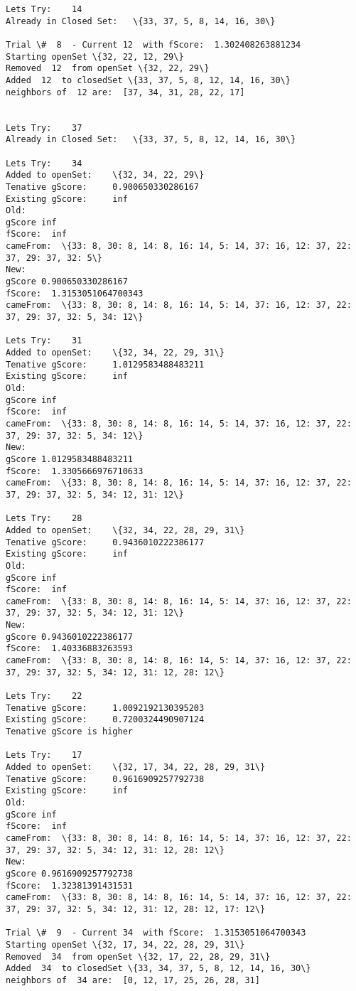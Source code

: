 \documentclass[11pt]{article}
\begin{document}
\begin{Verbatim}[commandchars=\\\{\}]
Lets Try:	 14
Already in Closed Set:	 \{33, 37, 5, 8, 14, 16, 30\}

Trial \#  8  - Current 12  with fScore:  1.302408263881234
Starting openSet \{32, 22, 12, 29\}
Removed  12  from openSet \{32, 22, 29\}
Added  12  to closedSet \{33, 37, 5, 8, 12, 14, 16, 30\}
neighbors of  12 are:  [37, 34, 31, 28, 22, 17] 


Lets Try:	 37
Already in Closed Set:	 \{33, 37, 5, 8, 12, 14, 16, 30\}

Lets Try:	 34
Added to openSet:	 \{32, 34, 22, 29\}
Tenative gScore:	 0.900650330286167
Existing gScore:	 inf
Old:
gScore inf
fScore:  inf
cameFrom:  \{33: 8, 30: 8, 14: 8, 16: 14, 5: 14, 37: 16, 12: 37, 22: 37, 29: 37, 32: 5\}
New:
gScore 0.900650330286167
fScore:  1.3153051064700343
cameFrom:  \{33: 8, 30: 8, 14: 8, 16: 14, 5: 14, 37: 16, 12: 37, 22: 37, 29: 37, 32: 5, 34: 12\}

Lets Try:	 31
Added to openSet:	 \{32, 34, 22, 29, 31\}
Tenative gScore:	 1.0129583488483211
Existing gScore:	 inf
Old:
gScore inf
fScore:  inf
cameFrom:  \{33: 8, 30: 8, 14: 8, 16: 14, 5: 14, 37: 16, 12: 37, 22: 37, 29: 37, 32: 5, 34: 12\}
New:
gScore 1.0129583488483211
fScore:  1.3305666976710633
cameFrom:  \{33: 8, 30: 8, 14: 8, 16: 14, 5: 14, 37: 16, 12: 37, 22: 37, 29: 37, 32: 5, 34: 12, 31: 12\}

Lets Try:	 28
Added to openSet:	 \{32, 34, 22, 28, 29, 31\}
Tenative gScore:	 0.9436010222386177
Existing gScore:	 inf
Old:
gScore inf
fScore:  inf
cameFrom:  \{33: 8, 30: 8, 14: 8, 16: 14, 5: 14, 37: 16, 12: 37, 22: 37, 29: 37, 32: 5, 34: 12, 31: 12\}
New:
gScore 0.9436010222386177
fScore:  1.40336883263593
cameFrom:  \{33: 8, 30: 8, 14: 8, 16: 14, 5: 14, 37: 16, 12: 37, 22: 37, 29: 37, 32: 5, 34: 12, 31: 12, 28: 12\}

Lets Try:	 22
Tenative gScore:	 1.0092192130395203
Existing gScore:	 0.7200324490907124
Tenative gScore is higher

Lets Try:	 17
Added to openSet:	 \{32, 17, 34, 22, 28, 29, 31\}
Tenative gScore:	 0.9616909257792738
Existing gScore:	 inf
Old:
gScore inf
fScore:  inf
cameFrom:  \{33: 8, 30: 8, 14: 8, 16: 14, 5: 14, 37: 16, 12: 37, 22: 37, 29: 37, 32: 5, 34: 12, 31: 12, 28: 12\}
New:
gScore 0.9616909257792738
fScore:  1.32381391431531
cameFrom:  \{33: 8, 30: 8, 14: 8, 16: 14, 5: 14, 37: 16, 12: 37, 22: 37, 29: 37, 32: 5, 34: 12, 31: 12, 28: 12, 17: 12\}

Trial \#  9  - Current 34  with fScore:  1.3153051064700343
Starting openSet \{32, 17, 34, 22, 28, 29, 31\}
Removed  34  from openSet \{32, 17, 22, 28, 29, 31\}
Added  34  to closedSet \{33, 34, 37, 5, 8, 12, 14, 16, 30\}
neighbors of  34 are:  [0, 12, 17, 25, 26, 28, 31] 



\end{Verbatim}
\end{document}
